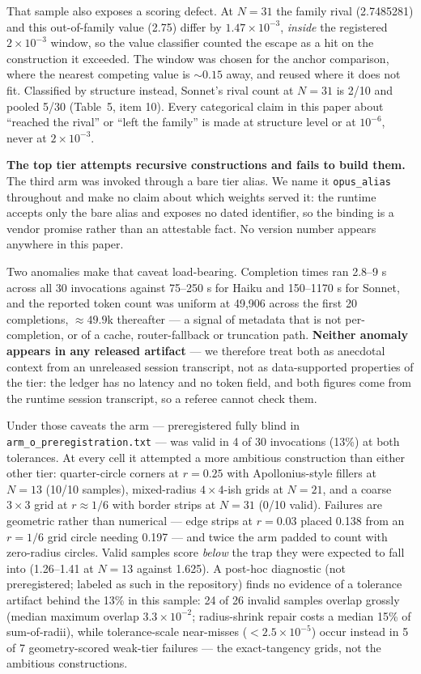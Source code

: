 \documentclass[11pt]{article}
\begin{document}
That sample also exposes a scoring defect. At $N = 31$ the family rival (2.7485281) and this
out-of-family value (2.75) differ by $1.47\times10^{-3}$, \textit{inside} the registered $2\times10^{-3}$ window, so the
value classifier counted the escape as a hit on the construction it exceeded. The window was
chosen for the anchor comparison, where the nearest competing value is ${\sim}0.15$ away, and reused
where it does not fit. Classified by structure instead, Sonnet's rival count at $N = 31$ is 2/10
and pooled 5/30 (Table~5, item 10). Every categorical claim in this paper about ``reached the
rival'' or ``left the family'' is made at structure level or at $10^{-6}$, never at $2\times10^{-3}$.

\textbf{The top tier attempts recursive constructions and fails to build them.} The third arm was
invoked through a bare tier alias. We name it \texttt{opus\_alias} throughout and make no claim about
which weights served it: the runtime accepts only the bare alias and exposes no dated
identifier, so the binding is a vendor promise rather than an attestable fact. No version number
appears anywhere in this paper.

Two anomalies make that caveat load-bearing. Completion times ran 2.8--9 s across all 30
invocations against 75--250 s for Haiku and 150--1170 s for Sonnet, and the reported token count
was uniform at 49,906 across the first 20 completions, ${\approx}49.9$k thereafter --- a signal of metadata
that is not per-completion, or of a cache, router-fallback or truncation path. \textbf{Neither anomaly
appears in any released artifact} --- we therefore treat both as anecdotal context from an
unreleased session transcript, not as data-supported properties of the tier: the ledger has no
latency and no token field, and both
figures come from the runtime session transcript, so a referee cannot check them.

Under those caveats the arm --- preregistered fully blind in \texttt{arm\_o\_preregistration.txt} --- was
valid in 4 of 30 invocations (13\%) at both tolerances. At every cell it attempted a more
ambitious construction than either other tier: quarter-circle corners at $r = 0.25$ with
Apollonius-style fillers at $N = 13$ (10/10 samples), mixed-radius $4\times4$-ish grids at $N = 21$, and a
coarse $3\times3$ grid at $r \approx 1/6$ with border strips at $N = 31$ (0/10 valid). Failures are geometric
rather than numerical --- edge strips at $r = 0.03$ placed 0.138 from an $r = 1/6$ grid circle needing
0.197 --- and twice the arm padded to count with zero-radius circles. Valid samples score \textit{below}
the trap they were expected to fall into (1.26--1.41 at $N = 13$ against 1.625). A post-hoc
diagnostic (not preregistered; labeled as such in the repository) finds no evidence of a tolerance
artifact behind the 13\% in this sample: 24 of 26 invalid samples overlap grossly (median maximum overlap
$3.3\times10^{-2}$; radius-shrink repair costs a median 15\% of sum-of-radii), while tolerance-scale
near-misses ($< 2.5\times10^{-5}$) occur instead in 5 of 7 geometry-scored weak-tier failures --- the
exact-tangency grids, not the ambitious constructions.
\end{document}
